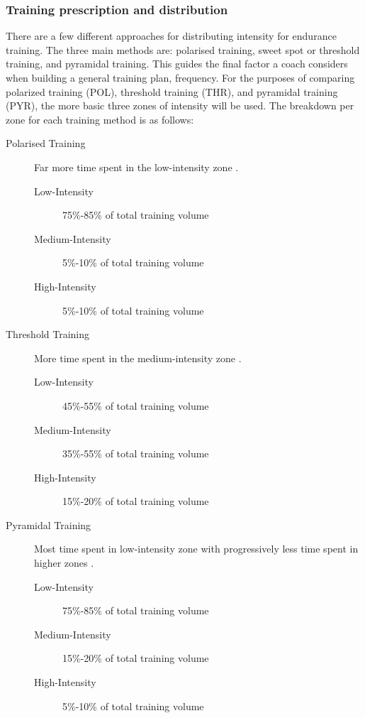 \subsubsection{Training prescription and distribution}
There are a few different approaches for distributing intensity for endurance training. The three main methods are: polarised training, sweet spot or threshold training, and pyramidal training. This guides the final factor a coach considers when building a general training plan, frequency. For the purposes of comparing polarized training (POL), threshold training (THR), and pyramidal training (PYR), the more basic three zones of intensity will be used. The breakdown per zone for each training method is as follows:
\begin{description}
  \item[Polarised Training] Far more time spent in the low-intensity zone \autocite{Seiler2004}.

  \begin{description}
    \item[Low-Intensity] 75\%-85\% of total training volume
    \item[Medium-Intensity] 5\%-10\% of total training volume
    \item[High-Intensity] 5\%-10\% of total training volume  
  \end{description} 
  \item[Threshold Training] More time spent in the medium-intensity zone \autocite{Seiler2004}.

  \begin{description}
    \item[Low-Intensity] 45\%-55\% of total training volume
    \item[Medium-Intensity] 35\%-55\% of total training volume
    \item[High-Intensity] 15\%-20\% of total training volume  
  \end{description}
  \item[Pyramidal Training] Most time spent in low-intensity zone with progressively less time spent in higher zones \autocite{Selles2019}.

  \begin{description}
    \item[Low-Intensity] 75\%-85\% of total training volume
    \item[Medium-Intensity] 15\%-20\% of total training volume
    \item[High-Intensity] 5\%-10\% of total training volume  
  \end{description}
\end{description}

